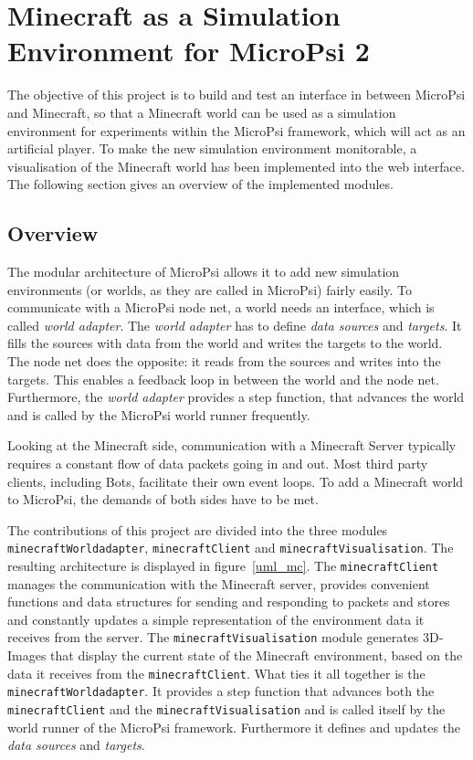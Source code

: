 \chapter{Minecraft as a Simulation Environment for MicroPsi 2}
The objective of this project is to build and test an interface in between MicroPsi and Minecraft, so that a Minecraft world can be used as a simulation environment for experiments within the MicroPsi framework, which will act as an artificial player. To make the new simulation environment monitorable, a visualisation of the Minecraft world has been implemented into the web interface. The following section gives an overview of the implemented modules.

\section{Overview}
The modular architecture of MicroPsi allows it to add new simulation environments (or worlds, as they are called in MicroPsi) fairly easily. To communicate with a MicroPsi node net, a world needs an interface, which is called \emph{world adapter}. The \emph{world adapter} has to define \emph{data sources} and \emph{targets}. It fills the sources with data from the world and writes the targets to the world. The node net does the opposite: it reads from the sources and writes into the targets. This enables a feedback loop in between the world and the node net. Furthermore, the \emph{world adapter} provides a step function, that advances the world and is called by the MicroPsi world runner frequently.

Looking at the Minecraft side, communication with a Minecraft Server typically requires a constant flow of data packets going in and out. Most third party clients, including Bots, facilitate their own event loops. To add a Minecraft world to MicroPsi, the demands of both sides have to be met.

The contributions of this project are divided into the three modules \texttt{minecraftWorldadapter}, \texttt{minecraftClient} and \texttt{minecraftVisualisation}. The resulting architecture is displayed in figure~\ref{uml_mc}. The \texttt{minecraftClient} manages the communication with the Minecraft server, provides convenient functions and data structures for sending and responding to packets and stores and constantly updates a simple representation of the environment data it receives from the server. The \texttt{minecraftVisualisation} module generates 3D-Images that display the current state of the Minecraft environment, based on the data it receives from the \texttt{minecraftClient}. What ties it all together is the \texttt{minecraftWorldadapter}. It provides a step function that advances both the \texttt{minecraftClient} and the \texttt{minecraftVisualisation} and is called itself by the world runner of the MicroPsi framework. Furthermore it defines and updates the \emph{data sources} and \emph{targets}.

